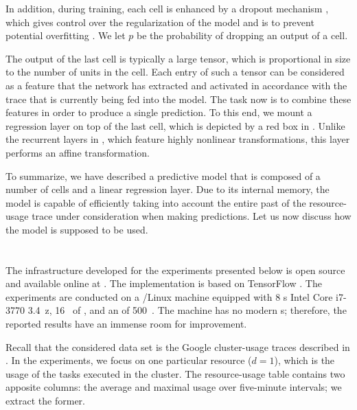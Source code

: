 In addition, during training, each cell is enhanced by a dropout mechanism
\cite{zaremba2014}, which gives control over the regularization of the model and
is to prevent potential overfitting \cite{hastie2013}. We let $p$ be the
probability of dropping an output of a cell.

The output of the last cell is typically a large tensor, which is proportional
in size to the number of units in the cell. Each entry of such a tensor can be
considered as a feature that the network has extracted and activated in
accordance with the trace that is currently being fed into the model. The task
now is to combine these features in order to produce a single prediction. To
this end, we mount a regression layer on top of the last cell, which is depicted
by a red box in . Unlike the recurrent layers in ,
which feature highly nonlinear transformations, this layer performs an affine
transformation.

To summarize, we have described a predictive model that is composed of a number
of  cells and a linear regression layer. Due to its internal memory,
the model is capable of efficiently taking into account the entire past of the
resource-usage trace under consideration when making predictions. Let us now
discuss how the model is supposed to be used.

\section{\resultstitle}

The infrastructure developed for the experiments presented below is open source
and available online at \cite{eslab2017b}. The implementation is based on
TensorFlow \cite{abadi2015}. The experiments are conducted on a /Linux
machine equipped with 8 s Intel Core i7-3770 3.4~z, 16~ of
, and an  of 500~. The machine has no modern s;
therefore, the reported results have an immense room for improvement.


Recall that the considered data set is the Google cluster-usage traces
\cite{reiss2011} described in . In the experiments, we focus on one
particular resource ($d = 1$), which is the  usage of the tasks executed
in the cluster. The resource-usage table contains two apposite columns: the
average and maximal  usage over five-minute intervals; we extract the
former.

